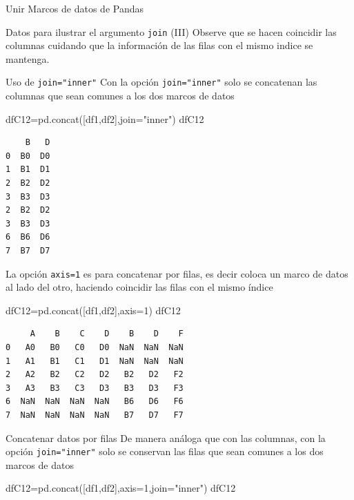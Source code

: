 \documentclass[
  ignorenonframetext,
  aspectratio=169,
  spanish,
]{beamer}
\newenvironment{Shaded}{\begin{snugshade}}{\end{snugshade}}
\newcommand{\DecValTok}[1]{\textcolor[rgb]{0.68,0.00,0.00}{#1}}
\newcommand{\NormalTok}[1]{\textcolor[rgb]{0.00,0.23,0.31}{#1}}
\newcommand{\OperatorTok}[1]{\textcolor[rgb]{0.37,0.37,0.37}{#1}}
\newcommand{\StringTok}[1]{\textcolor[rgb]{0.13,0.47,0.30}{#1}}
\begin{document}
\begin{frame}[fragile]{Unir Marcos de datos de Pandas}
\begin{block}{Datos para ilustrar el argumento \texttt{join} (III)}
Observe que se hacen coincidir las columnas cuidando que la información
de las filas con el mismo indice se mantenga.
\end{block}

\begin{block}{Uso de \texttt{join="inner"}}
\label{uso-de-joininner}
Con la opción \texttt{join="inner"} solo se concatenan las columnas que
sean comunes a los dos marcos de datos

\begin{Shaded}
\begin{Highlighting}[]
\NormalTok{dfC12}\OperatorTok{=}\NormalTok{pd.concat([df1,df2],join}\OperatorTok{=}\StringTok{"inner"}\NormalTok{)}
\NormalTok{dfC12}
\end{Highlighting}
\end{Shaded}

\begin{verbatim}
    B   D
0  B0  D0
1  B1  D1
2  B2  D2
3  B3  D3
2  B2  D2
3  B3  D3
6  B6  D6
7  B7  D7
\end{verbatim}

La opción \texttt{axis=1} es para concatenar por filas, es decir coloca
un marco de datos al lado del otro, haciendo coincidir las filas con el
mismo índice

\begin{Shaded}
\begin{Highlighting}[]
\NormalTok{dfC12}\OperatorTok{=}\NormalTok{pd.concat([df1,df2],axis}\OperatorTok{=}\DecValTok{1}\NormalTok{) }
\NormalTok{dfC12}
\end{Highlighting}
\end{Shaded}

\begin{verbatim}
     A    B    C    D    B    D    F
0   A0   B0   C0   D0  NaN  NaN  NaN
1   A1   B1   C1   D1  NaN  NaN  NaN
2   A2   B2   C2   D2   B2   D2   F2
3   A3   B3   C3   D3   B3   D3   F3
6  NaN  NaN  NaN  NaN   B6   D6   F6
7  NaN  NaN  NaN  NaN   B7   D7   F7
\end{verbatim}
\end{block}

\begin{block}{Concatenar datos por filas}
\label{concatenar-datos-por-filas}
De manera análoga que con las columnas, con la opción
\texttt{join="inner"} solo se conservan las filas que sean comunes a los
dos marcos de datos

\begin{Shaded}
\begin{Highlighting}[]
\NormalTok{dfC12}\OperatorTok{=}\NormalTok{pd.concat([df1,df2],axis}\OperatorTok{=}\DecValTok{1}\NormalTok{,join}\OperatorTok{=}\StringTok{"inner"}\NormalTok{)}
\NormalTok{dfC12}
\end{Highlighting}
\end{Shaded}


\end{block}
\end{frame}
\end{document}
